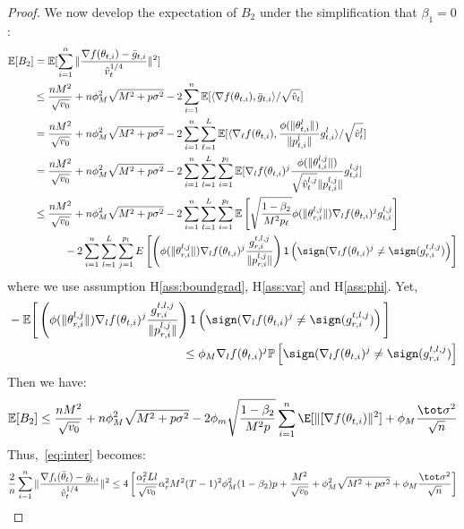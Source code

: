 \documentclass[twoside]{article}
\begin{document}
\begin{proof}
We now develop the expectation of $B_2$ under the simplification that $\beta_1 = 0$:
\begin{align}\notag
    \mathbb E[B_2]&=\mathbb E[\sum_{i=1}^n\Vert \frac{\nabla f(\theta_{t,i})-\bar g_{t,i}}{\hat v_t^{1/4}} \Vert^2] \\\notag
    &\leq \frac{nM^2}{\sqrt{v_0}}+n\phi_M^2\sqrt{M^2+p\sigma^2}-2\sum_{i=1}^n\mathbb E[\langle \nabla f(\theta_{t,i}),\bar g_{t,i} \rangle/\sqrt{\hat v_t}]\\\notag
    &=\frac{nM^2}{\sqrt{v_0}}+n\phi_M^2\sqrt{M^2+p\sigma^2}-2\sum_{i=1}^n \sum_{\ell=1}^L \mathbb E[\langle \nabla_\ell f(\theta_{t,i}),\frac{\phi(\|\theta_{t,i}^l \|)}{\| p_{t,i}^l \|}g_{t,i}^l \rangle/\sqrt{\hat v_t^l}]\\\notag
    &=\frac{nM^2}{\sqrt{v_0}}+n\phi_M^2\sqrt{M^2+p\sigma^2}-2\sum_{i=1}^n \sum_{l=1}^L\sum_{i=1}^{p_l} \mathbb E[\nabla_l f(\theta_{t,i})^j\frac{\phi(\|\theta_{t,i}^{l,j} \|)}{\sqrt{\hat v_t^{l,j}}\| p_{t,i}^{l,j} \|}g_{t,i}^{l,j} ]\\\notag
    & \leq \frac{nM^2}{\sqrt{v_0}}+n\phi_M^2\sqrt{M^2+p\sigma^2}-2\sum_{i=1}^n \sum_{l=1}^L\sum_{i=1}^{p_l} \mathbb E \left[ \sqrt{\frac{1-\beta_2}{M^2 p_\ell}}  \phi(\|\theta_{r,i}^{l,j}\|)  \nabla_l f(\theta_{t,i})^j  g_{t,i}^{l,j}\right]\\\notag
    &\hspace{0.4in} -2 \sum_{i = 1}^n \sum_{l=1}^L\sum_{j=1}^{p_l}  E \left[  \left( \phi(\|\theta_{r,i}^{l,j}\|)   \nabla_l f(\theta_{t,i})^j   \frac{g_{r,i}^{t,l,j}}{ \|p_{r,i}^{l,j}\|}\right)\mathsf{1}\left( \sign(  \nabla_l f(\theta_{t,i})^j \neq  \sign( g_{r,i}^{t,l,j}) \right)\right]
\end{align}
where we use assumption H\ref{ass:boundgrad}, H\ref{ass:var} and H\ref{ass:phi}. 
Yet,
\begin{align*}
&- \mathbb E \Bigg[  \left( \phi(\|\theta_{r,i}^{l,j}\|)   \nabla_l f(\theta_{t,i})^j   \frac{g_{r,i}^{t,l,j}}{ \|p_{r,i}^{l,j}\|}\right)\mathsf{1}\left( \sign(  \nabla_l f(\theta_{t,i})^j
\neq  \sign( g_{r,i}^{t,l,j}) \right)\Bigg] \\
&\hspace{2in} \leq  \phi_M \nabla_l f(\theta_{t,i})^j   \mathbb{P}\left[  \sign(  \nabla_l f(\theta_{t,i})^j \neq  \sign( g_{r,i}^{t,l,j}) \right]
\end{align*}
Then we have:
\begin{align}\notag
    \mathbb E[B_2]\leq  \frac{nM^2}{\sqrt{v_0}}+n\phi_M^2\sqrt{M^2+p\sigma^2}-2 \phi_m \sqrt{\frac{1-\beta_2}{M^2 p}} \sum_{i=1}^n \E[\| [\nabla f(\theta_{t,i}) \|^2] + \phi_M \frac{\tot \sigma^2}{\sqrt{n}}
\end{align}
Thus,~\eqref{eq:inter} becomes:
\begin{align}\notag
    \frac{2}{n}\sum_{i=1}^n\Vert \frac{\nabla f_i(\bar\theta_t)-\bar g_{t,i}}{\hat v_t^{1/4}} \Vert^2 \leq 4 \left[ \frac{\alpha_t^2 Ll}{\sqrt{v_0}} \alpha_r^2 M^2 (T-1)^2 \phi_M^2 (1-\beta_2)p + \frac{M^2}{\sqrt{v_0}}+\phi_M^2\sqrt{M^2+p\sigma^2} + \phi_M \frac{\tot \sigma^2}{\sqrt{n}}\right]
\end{align}


\end{proof}
\end{document}
